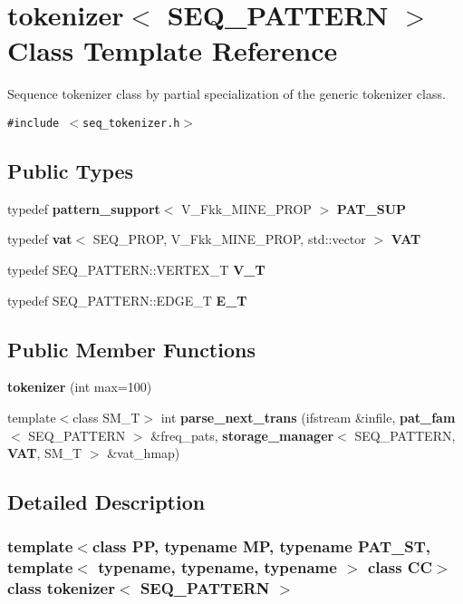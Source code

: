 \section{tokenizer$<$ SEQ\_\-PATTERN $>$ Class Template Reference}
\label{classtokenizer_3_01SEQ__PATTERN_01_4}
Sequence tokenizer class by partial specialization of the generic tokenizer class.  


{\tt \#include $<$seq\_\-tokenizer.h$>$}

\subsection*{Public Types}
\begin{CompactItemize}
\item 
typedef {\bf pattern\_\-support}$<$ V\_\-Fkk\_\-MINE\_\-PROP $>$ {\bf PAT\_\-SUP}\label{classtokenizer_3_01SEQ__PATTERN_01_4_w0}

\item 
typedef {\bf vat}$<$ SEQ\_\-PROP, V\_\-Fkk\_\-MINE\_\-PROP, std::vector $>$ {\bf VAT}\label{classtokenizer_3_01SEQ__PATTERN_01_4_w1}

\item 
typedef SEQ\_\-PATTERN::VERTEX\_\-T {\bf V\_\-T}\label{classtokenizer_3_01SEQ__PATTERN_01_4_w2}

\item 
typedef SEQ\_\-PATTERN::EDGE\_\-T {\bf E\_\-T}\label{classtokenizer_3_01SEQ__PATTERN_01_4_w3}

\end{CompactItemize}
\subsection*{Public Member Functions}
\begin{CompactItemize}
\item 
{\bf tokenizer} (int max=100)
\item 
template$<$class SM\_\-T$>$ int {\bf parse\_\-next\_\-trans} (ifstream \&infile, {\bf pat\_\-fam}$<$ SEQ\_\-PATTERN $>$ \&freq\_\-pats, {\bf storage\_\-manager}$<$ SEQ\_\-PATTERN, {\bf VAT}, SM\_\-T $>$ \&vat\_\-hmap)
\end{CompactItemize}


\subsection{Detailed Description}
\subsubsection*{template$<$class PP, typename MP, typename PAT\_\-ST, template$<$ typename, typename, typename $>$ class CC$>$ class tokenizer$<$ SEQ\_\-PATTERN $>$}

